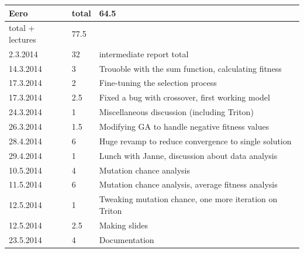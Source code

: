 \documentclass[twoside]{article}
\begin{document}
\begin{longtable}{ | l | l | p{10cm} | }
\end{longtable}

\begin{tabular}{|l|l|l|}
\hline
	\textbf{Eero} & \textbf{total} & \textbf{64.5} \\ \hline
	total + lectures & 77.5 & \  \\ \hline
	2.3.2014 & 32 & intermediate report total \\ \hline
	14.3.2014 & 3 & Trouoble with the sum function, calculating fitness \\ \hline
	17.3.2014 & 2 & Fine-tuning the selection process \\ \hline
	17.3.2014 & 2.5 & Fixed a bug with crossover, first working model \\ \hline
	24.3.2014 & 1 & Miscellaneous discussion (including Triton) \\ \hline
	26.3.2014 & 1.5 & Modifying GA to handle negative fitness values \\ \hline
	28.4.2014 & 6 & Huge revamp to reduce convergence to single solution \\ \hline
	29.4.2014 & 1 & Lunch with Janne, discussion about data analysis \\ \hline
	10.5.2014 & 4 & Mutation chance analysis \\ \hline
	11.5.2014 & 6 & Mutation chance analysis, average fitness analysis \\ \hline
	12.5.2014 & 1 & Tweaking mutation chance, one more iteration on Triton \\ \hline
	12.5.2014 & 2.5 & Making slides \\ \hline
	23.5.2014 & 4 & Documentation \\ \hline
\end{tabular}
\end{document}
